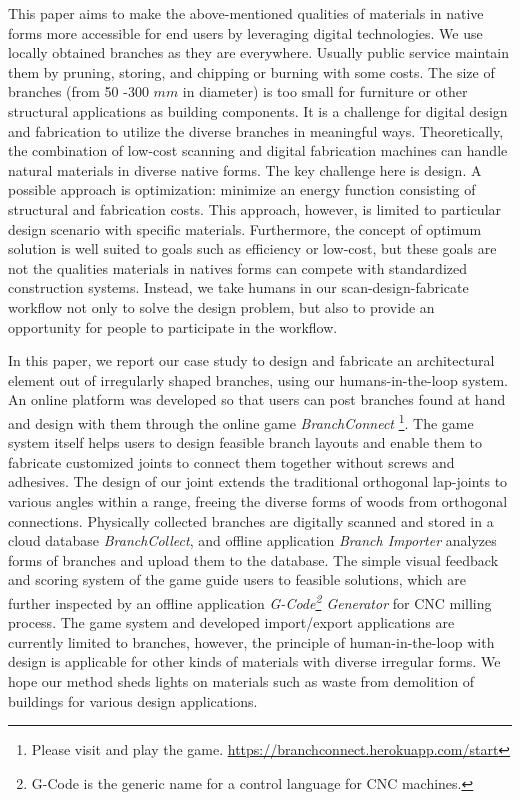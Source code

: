 This paper aims to make the above-mentioned qualities of materials in native forms more accessible for end users by leveraging digital technologies.
We use locally obtained branches as they are everywhere.
Usually public service maintain them by pruning, storing, and chipping or burning with some costs.
The size of branches (from 50 -300 $mm$ in diameter) is too small for furniture or other structural applications as building components.
It is a challenge for digital design and fabrication to utilize the diverse branches in meaningful ways.
Theoretically, the combination of low-cost scanning and digital fabrication machines can handle natural materials in diverse native forms.
The key challenge here is design.
A possible approach is optimization: minimize an energy function consisting of structural and fabrication costs.
This approach, however, is limited to particular design scenario with specific materials.
Furthermore, the concept of optimum solution is well suited to goals such as efficiency or low-cost, but these goals are not the qualities materials in natives forms can compete with standardized construction systems.
Instead, we take humans in our scan-design-fabricate workflow not only to solve the design problem, but also to provide an opportunity for people to participate in the workflow.

In this paper, we report our case study to design and fabricate an architectural element out of irregularly shaped branches, using our humans-in-the-loop system.
An online platform was developed so that users can post branches found at hand and design with them through the online game \textit{BranchConnect} \footnote{Please visit and play the game. \url{https://branchconnect.herokuapp.com/start}}.
The game system itself helps users to design feasible branch layouts and enable them to fabricate customized joints to connect them together without screws and adhesives.
The design of our joint extends the traditional orthogonal lap-joints to various angles within a range, freeing the diverse forms of woods from orthogonal connections.
Physically collected branches are digitally scanned and stored in a cloud database \textit{BranchCollect}, and offline application \textit{Branch Importer} analyzes forms of branches and upload them to the database.
The simple visual feedback and scoring system of the game guide users to feasible solutions, which are further inspected by an offline application \textit{G-Code\footnote{G-Code is the generic name for a control language for CNC machines.} Generator} for CNC milling process.
The game system and developed import/export applications are currently limited to branches, however, the principle of human-in-the-loop with design is applicable for other kinds of materials with diverse irregular forms.
We hope our method sheds lights on materials such as waste from demolition of buildings for various design applications.

